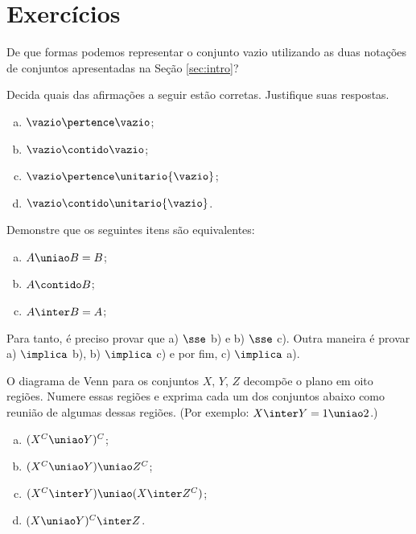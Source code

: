 \section{Exercícios}

\begin{exercise}
  \label{exe:vazio-notacao}
	De que formas podemos representar o conjunto vazio utilizando as duas notações de conjuntos apresentadas na Seção \ref{sec:intro}?
\end{exercise}

\begin{exercise}
  \label{exe:vazios-tricky}
	Decida quais das afirmações a seguir estão corretas. Justifique suas respostas.
	\begin{enumerate}[a)]
		\item $\vazio \pertence \vazio$;
		\item $\vazio \contido \vazio$;
		\item $\vazio \pertence \unitario{\vazio}$;
		\item $\vazio \contido \unitario{\vazio}$.
	\end{enumerate}
\end{exercise}

\begin{exercise}
  Demonstre que os seguintes itens são equivalentes:
    \begin{enumerate}[a)]
      \item $A \uniao B = B$;
      \item $A \contido B$;
      \item $A \inter B = A$;
    \end{enumerate}
    \begin{hint}
      Para tanto, é preciso provar que a) $\sse$ b) e b) $\sse$ c). Outra maneira é provar a) $\implica$ b), b) $\implica$ c) e por fim, c) $\implica$ a).
    \end{hint}
\end{exercise}

\begin{exercise}
  O diagrama de Venn para os conjuntos $X$, $Y$, $Z$ decompõe o plano em oito regiões. Numere essas regiões e exprima cada um dos conjuntos abaixo como reunião de algumas dessas regiões. (Por exemplo: $X \inter Y = 1 \uniao 2$.)
  \begin{enumerate}[a)]
    \item $(X^C \uniao Y)^C$;
    \item $(X^C \uniao Y) \uniao Z^C$;
    \item $(X^C \inter Y) \uniao (X \inter Z^C)$;
    \item $(X \uniao Y)^C \inter Z$.
  \end{enumerate}
\end{exercise}

